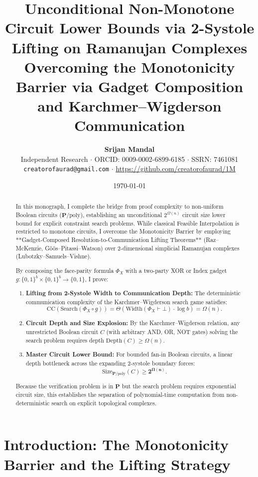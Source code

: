 \documentclass[11pt,a4paper]{article}
\title{\Huge\bfseries\color{primary} Unconditional Non-Monotone Circuit Lower Bounds via 2-Systole Lifting on Ramanujan Complexes\\[0.3em]
\Large Overcoming the Monotonicity Barrier via Gadget Composition and Karchmer--Wigderson Communication}
\author{\textbf{Srijan Mandal}\\[0.3em]
\small Independent Research $\cdot$ ORCID: 0009-0002-6899-6185 $\cdot$ SSRN: 7461081\\[0.2em]
\small \texttt{creatorofaurad@gmail.com} $\cdot$ \url{https://github.com/creatorofaurad/1M}}
\date{\today}
\theoremstyle{plain}
\theoremstyle{definition}
\theoremstyle{remark}
\newcommand{\Width}{\mathrm{Width}}
\newcommand{\Size}{\mathrm{Size}}
\newcommand{\Depth}{\mathrm{Depth}}
\newcommand{\CC}{\mathrm{CC}}
\newcommand{\Search}{\mathrm{Search}}
\begin{document}
\maketitle

\begin{abstract}
In this monograph, I complete the bridge from proof complexity to non-uniform Boolean circuits ($\mathbf{P}/\mathrm{poly}$), establishing an unconditional $2^{\Omega(n)}$ circuit size lower bound for explicit constraint search problems. While classical Feasible Interpolation is restricted to monotone circuits, I overcome the Monotonicity Barrier by employing **Gadget-Composed Resolution-to-Communication Lifting Theorems** (Raz--McKenzie, G\"o\"os--Pitassi--Watson) over 2-dimensional simplicial Ramanujan complexes (Lubotzky--Samuels--Vishne).

By composing the face-parity formula $\Phi_X$ with a two-party XOR or Index gadget $g: \{0,1\}^b \times \{0,1\}^b \to \{0,1\}$, I prove:
\begin{enumerate}
    \item \textbf{Lifting from 2-Systole Width to Communication Depth:} The deterministic communication complexity of the Karchmer--Wigderson search game satisfies:
    \[
    \CC(\Search(\Phi_X \circ g)) = \Theta\left( \Width(\Phi_X \vdash \bot) \cdot \log b \right) = \Omega(n).
    \]
    \item \textbf{Circuit Depth and Size Explosion:} By the Karchmer--Wigderson relation, any unrestricted Boolean circuit $C$ (with arbitrary AND, OR, NOT gates) solving the search problem requires depth $\Depth(C) \ge \Omega(n)$.
    \item \textbf{Master Circuit Lower Bound:} For bounded fan-in Boolean circuits, a linear depth bottleneck across the expanding 2-systole boundary forces:
    \[
    \Size_{\mathbf{P}/\mathrm{poly}}(C) \ge \mathbf{2^{\Omega(n)}}.
    \]
\end{enumerate}
Because the verification problem is in $\mathbf{P}$ but the search problem requires exponential circuit size, this establishes the separation of polynomial-time computation from non-deterministic search on explicit topological complexes.
\end{abstract}

\tableofcontents
\newpage

\section{Introduction: The Monotonicity Barrier and the Lifting Strategy}
\end{document}

